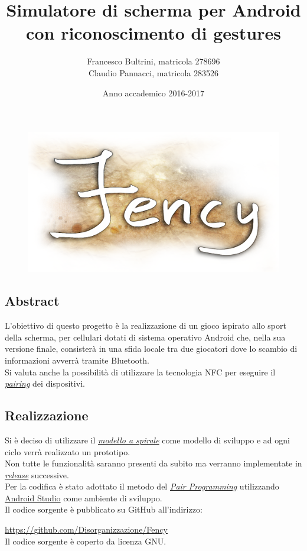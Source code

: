 \documentclass[a4paper,11pt]{article}
\title{Simulatore di scherma per Android\\con riconoscimento di gestures}
\author{Francesco Bultrini, matricola 278696\\
 Claudio Pannacci, matricola 283526}
\date{Anno accademico 2016-2017}
\begin{document}
\begin{figure}[t]

  \centering
  \includegraphics{img_fency_logo}

\end{figure}

\maketitle
\newpage

\tableofcontents

\listoffigures

\newpage

\subsection{Abstract}
L'obiettivo di questo progetto è la realizzazione di un gioco  ispirato allo sport della scherma, per cellulari dotati di sistema operativo Android che, nella sua versione finale, consisterà in una sfida locale tra due giocatori dove lo scambio di informazioni avverrà tramite Bluetooth.\\ Si valuta anche la possibilità di utilizzare la tecnologia NFC per eseguire il \hyperref[pairing]{\emph{pairing}} dei dispositivi.
\newpage

\subsection{Realizzazione}
Si è deciso di utilizzare il \hyperref[spirale]{\emph{modello a spirale}} come modello di sviluppo e ad ogni ciclo verrà realizzato un prototipo.\\ Non tutte le funzionalità saranno presenti da subito ma verranno implementate in \hyperref[release]{\emph{release}} successive.\\Per la codifica è stato adottato il metodo del \hyperref[pairp]{\emph{Pair Programming}} utilizzando \href{https://developer.android.com/studio/index.html}{Android Studio} come ambiente di sviluppo.\\Il codice sorgente è pubblicato su GitHub all'indirizzo: \begin{center}
\url{https://github.com/Disorganizzazione/Fency}\\
{\footnotesize Il codice sorgente è coperto da licenza GNU.}
\end{center}
\newpage
\end{document}
